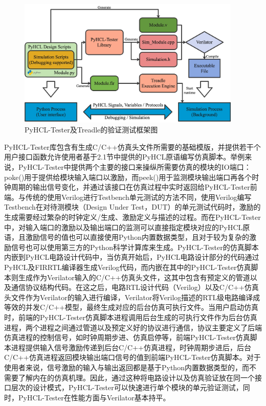 \begin{figure}[htbp]
	\centering
	\includegraphics[width=0.95\textwidth]{Photos/PyHCL-Tester.jpg}
	\caption{PyHCL-Tester及Treadle的验证测试框架图}
\end{figure}

PyHCL-Tester库包含有生成C/C++仿真头文件所需要的基础模版，并提供若干个用户接口函数允许使用者基于2.1节中提供的PyHCL原语编写仿真脚本。举例来说，PyHCL-Tester中提供两个主要的接口来操纵所需要仿真的模块的IO端口：poke()用于提供给模块输入端口以激励，而peek()用于监测模块输出端口再各个时钟周期的输出信号变化，并通过该接口在仿真过程中实时返回给PyHCL-Tester前端。与传统的使用Verilog进行Testbench单元测试的方法不同，使用Verilog编写Testbench在对待测模块（Design Under Test，DUT）的单元测试代码时，激励的生成需要经过繁杂的时钟定义/生成、激励定义与描述的过程。而在PyHCL-Tester中，对输入端口的激励以及输出端口的监测可以直接指定模块对应的PyHCL原语，且激励信号的值也可以直接使用Python内置数据类型，且对于较为复杂的激励信号也可以使用第三方的Python科学计算库来生成。PyHCL-Tester的仿真脚本内嵌到PyHCL电路设计代码中，当仿真开始后，PyHCL电路设计部分的代码通过PyHCL及FIRRTL编译器生成Verilog代码，而内嵌在其中的PyHCL-Tester仿真脚本则生成作为Verilator输入的C/C++仿真头文件，这其中包含有预定义的管道以及通信协议结构代码。在这之后，电路RTL设计代码（Verilog）以及C/C++仿真头文件作为Verilator的输入进行编译，Verilator将Verilog描述的RTL级电路编译成等效的并发C/C++模型，最终生成对应的后台仿真可执行文件。当用户启动仿真时，前端的PyHCL-Tester仿真脚本进程调用后台生成的可执行文件作为后台仿真进程，两个进程之间通过管道以及预定义好的协议进行通信，协议主要定义了后端仿真进程的控制信号，如时钟周期步进、仿真启停等，前端PyHCL-Tester仿真脚本进程提供输入信号激励传递到后台C/C++仿真进程，时钟周期步进后，后台C/C++仿真进程返回模块输出端口信号的值到前端PyHCL-Tester仿真脚本。对于使用者来说，信号激励的输入与输出返回都是基于Python内置数据类型的，而不需要了解内在的仿真机理。因此，通过这种将电路设计以及仿真验证放在同一个接口层次的设计模式，PyHCL-Tester可以快速进行单个模块的单元验证测试，同时，PyHCL-Tester在性能方面与Verilator基本持平。

